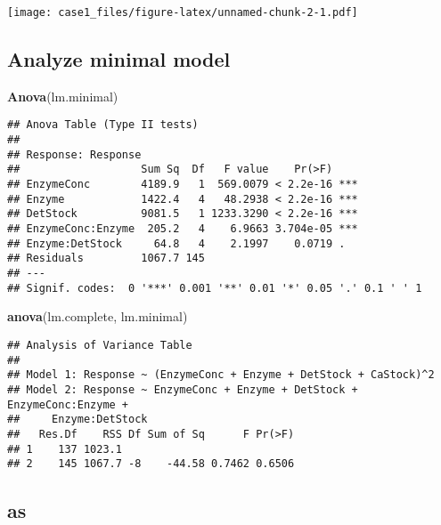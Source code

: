 \documentclass[
]{article}
\newenvironment{Shaded}{\begin{snugshade}}{\end{snugshade}}
\newcommand{\DataTypeTok}[1]{\textcolor[rgb]{0.13,0.29,0.53}{#1}}
\newcommand{\DecValTok}[1]{\textcolor[rgb]{0.00,0.00,0.81}{#1}}
\newcommand{\KeywordTok}[1]{\textcolor[rgb]{0.13,0.29,0.53}{\textbf{#1}}}
\newcommand{\NormalTok}[1]{#1}
\newcommand{\OperatorTok}[1]{\textcolor[rgb]{0.81,0.36,0.00}{\textbf{#1}}}
\newcommand{\StringTok}[1]{\textcolor[rgb]{0.31,0.60,0.02}{#1}}
\begin{document}
\texttt{[image: case1\_files/figure-latex/unnamed-chunk-2-1.pdf]}

\hypertarget{analyze-minimal-model}{%
\subsection{Analyze minimal model}\label{analyze-minimal-model}}

\begin{Shaded}
\begin{Highlighting}[]
\KeywordTok{Anova}\NormalTok{(lm.minimal)}
\end{Highlighting}
\end{Shaded}

\begin{verbatim}
## Anova Table (Type II tests)
## 
## Response: Response
##                   Sum Sq  Df   F value    Pr(>F)    
## EnzymeConc        4189.9   1  569.0079 < 2.2e-16 ***
## Enzyme            1422.4   4   48.2938 < 2.2e-16 ***
## DetStock          9081.5   1 1233.3290 < 2.2e-16 ***
## EnzymeConc:Enzyme  205.2   4    6.9663 3.704e-05 ***
## Enzyme:DetStock     64.8   4    2.1997    0.0719 .  
## Residuals         1067.7 145                        
## ---
## Signif. codes:  0 '***' 0.001 '**' 0.01 '*' 0.05 '.' 0.1 ' ' 1
\end{verbatim}

\begin{Shaded}
\begin{Highlighting}[]
\KeywordTok{anova}\NormalTok{(lm.complete, lm.minimal)}
\end{Highlighting}
\end{Shaded}

\begin{verbatim}
## Analysis of Variance Table
## 
## Model 1: Response ~ (EnzymeConc + Enzyme + DetStock + CaStock)^2
## Model 2: Response ~ EnzymeConc + Enzyme + DetStock + EnzymeConc:Enzyme + 
##     Enzyme:DetStock
##   Res.Df    RSS Df Sum of Sq      F Pr(>F)
## 1    137 1023.1                           
## 2    145 1067.7 -8    -44.58 0.7462 0.6506
\end{verbatim}

\hypertarget{as}{%
\subsection{as}\label{as}}

\begin{Shaded}
\end{Shaded}
\end{document}

